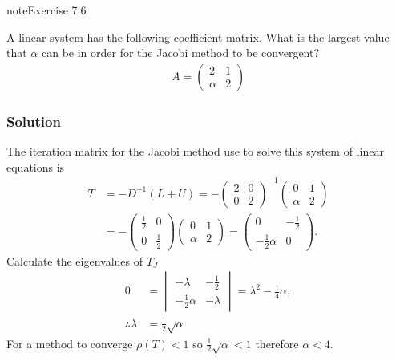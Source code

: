 \documentclass[letterpaper,10pt,english]{jupyterBook}
\begin{document}
\begin{sphinxadmonition}{note}{Exercise 7.6}

\sphinxAtStartPar
A linear system has the following coefficient matrix. What is the largest value that \(\alpha\) can be in order for the Jacobi method to be convergent?
\begin{align*}
    A = \begin{pmatrix}
        2 & 1 \\
        \alpha  & 2
    \end{pmatrix}
\end{align*}\subsubsection*{Solution}

\sphinxAtStartPar
The iteration matrix for the Jacobi method use to solve this system of linear equations is
\begin{align*}
    T &= -D^{-1}(L + U) 
    = - \begin{pmatrix} 2 & 0 \\ 0 & 2 \end{pmatrix}^{-1}
    \begin{pmatrix} 0 & 1 \\ \alpha & 2 \end{pmatrix} \\
    &= -\begin{pmatrix} \frac{1}{2} & 0 \\ 0 & \frac{1}{2} \end{pmatrix}
    \begin{pmatrix} 0 & 1 \\ \alpha & 2 \end{pmatrix}
    = \begin{pmatrix} 0 & -\frac{1}{2} \\ -\frac{1}{2} \alpha & 0 \end{pmatrix}.
\end{align*}
\sphinxAtStartPar
Calculate the eigenvalues of \(T_J\)
\begin{align*}
    0 &= \begin{vmatrix} -\lambda & -\frac{1}{2} \\ -\frac{1}{2} \alpha & -\lambda \end{vmatrix}
    = \lambda^2 - \frac{1}{4} \alpha, \\
    \therefore \lambda &= \frac{1}{2} \sqrt{\alpha}
\end{align*}
\sphinxAtStartPar
For a method to converge \(\rho(T) < 1\) so \(\frac{1}{2} \sqrt{\alpha} < 1\) therefore \(\alpha < 4\).
\end{sphinxadmonition}
\end{document}
